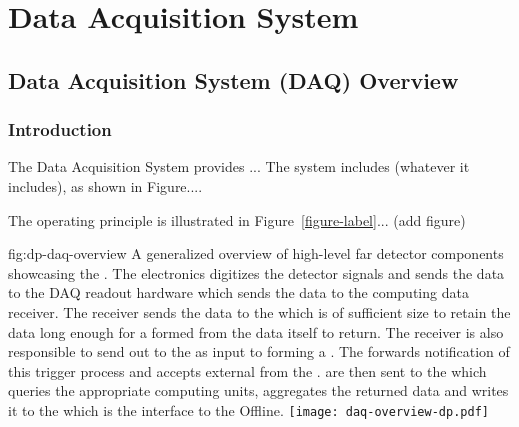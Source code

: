 \chapter{Data Acquisition System}
\label{ch:fddp-daq}

\section{Data Acquisition System (DAQ) Overview}
\label{sec:fddp-daq-ov}


\subsection{Introduction}
\label{sec:fddp-daq-intro}

The Data Acquisition System provides ...
The system includes (whatever it includes), as shown in Figure.... 


The operating principle is illustrated in Figure~\ref{figure-label}... (add figure)

\begin{dunefigure}{fig:dp-daq-overview}
  {A generalized overview of high-level far detector 
    components showcasing the  . 
    The electronics digitizes the detector signals and sends the data
    to the DAQ  readout hardware which sends the data to the
     computing data receiver.
    The receiver sends the data to the  which is of
    sufficient size to retain the data long enough for a
     formed from the data itself to return.
    The receiver is also responsible to send out  to the
     as input to forming a . 
    The  forwards notification of this trigger process
    and accepts external  from the .
     are then sent to the  which queries
    the appropriate  computing units, aggregates the
    returned data and writes it to the  which is the
    interface to the Offline.}
  \texttt{[image: daq-overview-dp.pdf]}%
\end{dunefigure}


